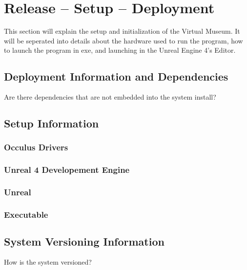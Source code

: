 
\chapter{Release -- Setup -- Deployment}
This section will explain the setup and initialization of the Virtual Museum. It will be seperated into details about the hardware used to run the program, how to launch the program in exe, and launching in the Unreal Engine 4's Editor.


\section{Deployment Information and Dependencies}
Are there dependencies that are not embedded into the system install? 



\section{Setup Information}

\subsection{Occulus Drivers}

\subsection{Unreal 4 Developement Engine}

\subsection{Unreal }

\subsection{Executable}

\section{System  Versioning Information}
How is the system versioned? 
